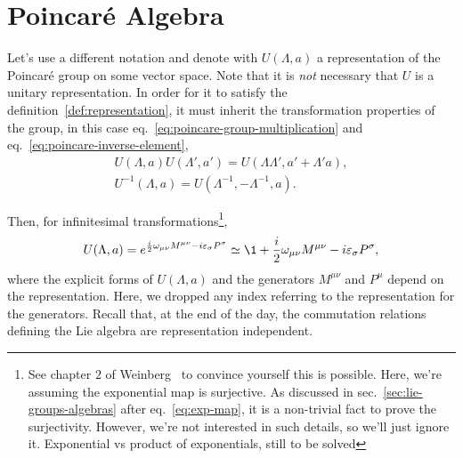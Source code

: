 \section{Poincaré Algebra}
Let's use a different notation and denote with $U(\Lambda, a)$ a representation of the Poincaré group on some vector space. Note that it is \emph{not} necessary that $U$ is a unitary representation. In order for it to satisfy the definition~\ref{def:representation}, it must inherit the transformation properties of the group, in this case eq.~\eqref{eq:poincare-group-multiplication} and eq.~\eqref{eq:poincare-inverse-element},
\begin{subequations}
\begin{gather}
    U(\Lambda, a) U(\Lambda',a') = U(\Lambda\Lambda', a' + \Lambda' a) , \label{eq:representation-poincare-group-multiplication} \\
    U^{-1} (\Lambda, a) = U(\Lambda^{-1},-\Lambda^{-1},a) . \label{eq:representation-poincare-inverse-element}
\end{gather}
\end{subequations}

Then, for infinitesimal transformations\footnote{See chapter $2$ of Weinberg~\cite{weinberg} to convince yourself this is possible. Here, we're assuming the exponential map is surjective. As discussed in sec.~\ref{sec:lie-groups-algebras} after eq.~\eqref{eq:exp-map}, it is a non-trivial fact to prove the surjectivity. However, we're not interested in such details, so we'll just ignore it. \color{red} Exponential vs product of exponentials, still to be solved \color{black}},
\begin{equation}\label{eq:infinitesimal-poicare-transformation}
    U(\Lambda, a) = e^{\frac{i}{2} \omega_{\mu\nu} M^{\mu\nu} - i \epsilon_\sigma P^\sigma} \simeq \1 + \frac{i}{2} \omega_{\mu\nu} M^{\mu\nu} - i \epsilon_\sigma P^\sigma,
\end{equation}
where the explicit forms of $U(\Lambda,a)$ and the generators $M^{\mu\nu}$ and $P^\mu$ depend on the representation. Here, we dropped any index referring to the representation for the generators. Recall that, at the end of the day, the commutation relations defining the Lie algebra are representation independent.

